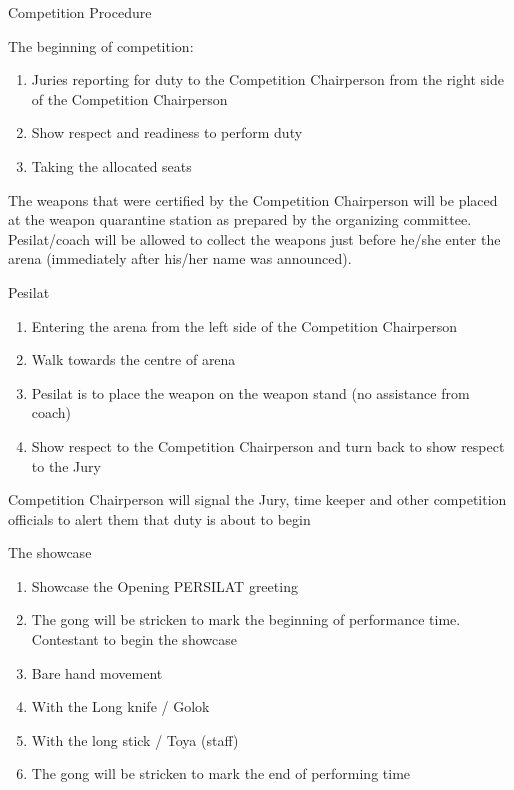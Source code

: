 \begin{legal}
\item Competition Procedure
    \begin{legal}
    \item The beginning of competition:
        \begin{enumerate}[label=\alph*.]
        \item Juries reporting for duty to the Competition Chairperson from the right side of the Competition Chairperson
        \item Show respect and readiness to perform duty
        \item Taking the allocated seats
        \end{enumerate}

    \item The weapons that were certified by the Competition Chairperson will be placed at the weapon quarantine station as prepared by the organizing committee.\\

Pesilat/coach will be allowed to collect the weapons just before he/she enter the arena (immediately after his/her name was announced).

    \item Pesilat
        \begin{enumerate}[label=\alph*.]
        \item Entering the arena from the left side of the Competition Chairperson
        \item Walk towards the centre of arena
        \item Pesilat is to place the weapon on the weapon stand (no assistance from coach)
        \item Show respect to the Competition Chairperson and turn back to show respect to the Jury
        \end{enumerate}

    \item Competition Chairperson will signal the Jury, time keeper and other competition officials to alert them 
        that duty is about to begin

    \item The showcase
        \begin{enumerate}[label=\alph*.]
        \item Showcase the Opening PERSILAT greeting
        \item The gong will be stricken to mark the beginning of performance time. Contestant to begin the showcase
        \item Bare hand movement
        \item With the Long knife / Golok
        \item With the long stick / Toya (staff)
        \item The gong will be stricken to mark the end of performing time
        \end{enumerate}
    

\end{legal}
\end{legal}
